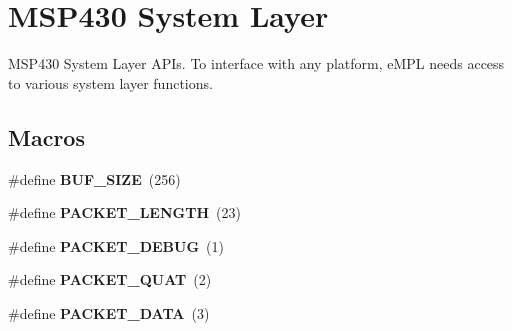 \hypertarget{group___m_s_p430___system___layer}{}\section{M\+S\+P430 System Layer}
\label{group___m_s_p430___system___layer}


M\+S\+P430 System Layer A\+P\+Is. To interface with any platform, e\+M\+P\+L needs access to various system layer functions.  


\subsection*{Macros}
\begin{DoxyCompactItemize}
\item 
\hypertarget{group___m_s_p430___system___layer_ga6821bafc3c88dfb2e433a095df9940c6}{}\#define {\bfseries B\+U\+F\+\_\+\+S\+I\+Z\+E}~(256)\label{group___m_s_p430___system___layer_ga6821bafc3c88dfb2e433a095df9940c6}

\item 
\hypertarget{group___m_s_p430___system___layer_gaf09b64f369b27803e9b840ebde07a532}{}\#define {\bfseries P\+A\+C\+K\+E\+T\+\_\+\+L\+E\+N\+G\+T\+H}~(23)\label{group___m_s_p430___system___layer_gaf09b64f369b27803e9b840ebde07a532}

\item 
\hypertarget{group___m_s_p430___system___layer_ga2eb1ff1c6bbd4b37e197ad694d26375c}{}\#define {\bfseries P\+A\+C\+K\+E\+T\+\_\+\+D\+E\+B\+U\+G}~(1)\label{group___m_s_p430___system___layer_ga2eb1ff1c6bbd4b37e197ad694d26375c}

\item 
\hypertarget{group___m_s_p430___system___layer_gaa8f5d0807280172e075735882266756f}{}\#define {\bfseries P\+A\+C\+K\+E\+T\+\_\+\+Q\+U\+A\+T}~(2)\label{group___m_s_p430___system___layer_gaa8f5d0807280172e075735882266756f}

\item 
\hypertarget{group___m_s_p430___system___layer_ga01ec1bff07ef38453df28ebc8d6a1832}{}\#define {\bfseries P\+A\+C\+K\+E\+T\+\_\+\+D\+A\+T\+A}~(3)\label{group___m_s_p430___system___layer_ga01ec1bff07ef38453df28ebc8d6a1832}

\end{DoxyCompactItemize}
